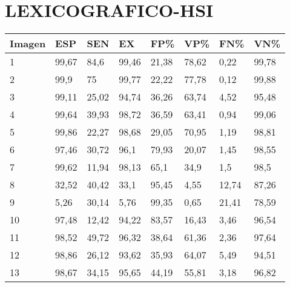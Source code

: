 \section{LEXICOGRAFICO-HSI}
\begin{longtable}[c]{|l|l|l|l|l|l|l|l|}
\hline
\textbf{Imagen} & \textbf{ESP} & \textbf{SEN} & \textbf{EX} & \textbf{FP\%} & \textbf{VP\%} & \textbf{FN\%} & \textbf{VN\%} \\ \hline
\endfirsthead
%
\endhead
%
1               & 99,67        & 84,6         & 99,46       & 21,38         & 78,62         & 0,22          & 99,78         \\ \hline
2               & 99,9         & 75           & 99,77       & 22,22         & 77,78         & 0,12          & 99,88         \\ \hline
3               & 99,11        & 25,02        & 94,74       & 36,26         & 63,74         & 4,52          & 95,48         \\ \hline
4               & 99,64        & 39,93        & 98,72       & 36,59         & 63,41         & 0,94          & 99,06         \\ \hline
5               & 99,86        & 22,27        & 98,68       & 29,05         & 70,95         & 1,19          & 98,81         \\ \hline
6               & 97,46        & 30,72        & 96,1        & 79,93         & 20,07         & 1,45          & 98,55         \\ \hline
7               & 99,62        & 11,94        & 98,13       & 65,1          & 34,9          & 1,5           & 98,5          \\ \hline
8               & 32,52        & 40,42        & 33,1        & 95,45         & 4,55          & 12,74         & 87,26         \\ \hline
9               & 5,26         & 30,14        & 5,76        & 99,35         & 0,65          & 21,41         & 78,59         \\ \hline
10              & 97,48        & 12,42        & 94,22       & 83,57         & 16,43         & 3,46          & 96,54         \\ \hline
11              & 98,52        & 49,72        & 96,32       & 38,64         & 61,36         & 2,36          & 97,64         \\ \hline
12              & 98,86        & 26,12        & 93,62       & 35,93         & 64,07         & 5,49          & 94,51         \\ \hline
13              & 98,67        & 34,15        & 95,65       & 44,19         & 55,81         & 3,18          & 96,82         \\ \hline

\end{longtable}
